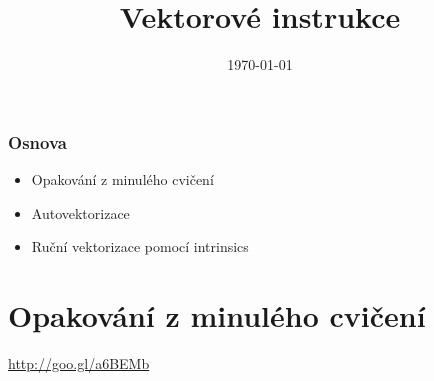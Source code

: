 \documentclass[usenames,dvipsnames,9pt]{beamer}
\title{Vektorové instrukce}
\date{\today}
\institute{B4B36PDV -- Paralelní a distribuované výpočty}
\begin{document}
\maketitle

\begin{frame}
  \frametitle{Osnova}
  \begin{itemize}
    \item Opakování z minulého cvičení\\[1.5em]
    \item Autovektorizace
    \item Ruční vektorizace pomocí intrinsics\\[1.5em]
  \end{itemize}
\end{frame}


\section{Opakování z minulého cvičení}

\begin{frame}[standout]
  \Huge
  \url{http://goo.gl/a6BEMb}
\end{frame}
\end{document}
